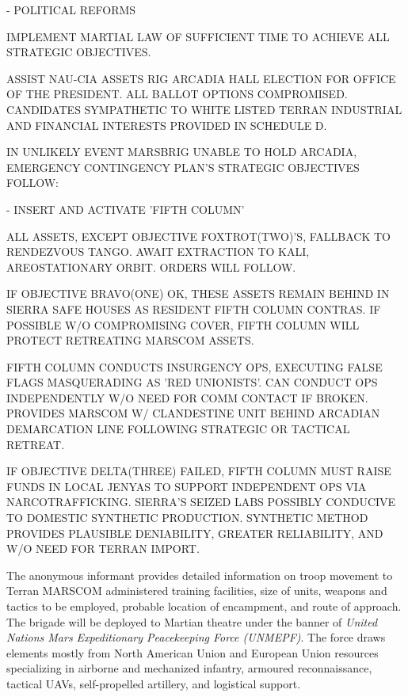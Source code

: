 \item {} - POLITICAL REFORMS
    \startitemize[n]
    \item IMPLEMENT MARTIAL LAW OF SUFFICIENT TIME TO ACHIEVE ALL STRATEGIC OBJECTIVES.
    \item ASSIST NAU-CIA ASSETS RIG ARCADIA HALL ELECTION FOR OFFICE OF THE PRESIDENT. ALL BALLOT OPTIONS COMPROMISED. CANDIDATES SYMPATHETIC TO WHITE LISTED TERRAN INDUSTRIAL AND FINANCIAL INTERESTS PROVIDED IN SCHEDULE D.
    \stopitemize
\stopitemize

IN UNLIKELY EVENT MARSBRIG UNABLE TO HOLD ARCADIA, EMERGENCY CONTINGENCY PLAN'S STRATEGIC OBJECTIVES FOLLOW:
\startitemize[4]
\item {} - INSERT AND ACTIVATE 'FIFTH COLUMN'

    \startitemize[n]
    \item ALL ASSETS, EXCEPT OBJECTIVE FOXTROT(TWO)'S, FALLBACK TO RENDEZVOUS TANGO. AWAIT EXTRACTION TO KALI, AREOSTATIONARY ORBIT. ORDERS WILL FOLLOW.

    \item IF OBJECTIVE BRAVO(ONE) OK, THESE ASSETS REMAIN BEHIND IN SIERRA SAFE HOUSES AS RESIDENT FIFTH COLUMN CONTRAS. IF POSSIBLE W/O COMPROMISING COVER, FIFTH COLUMN WILL PROTECT RETREATING MARSCOM ASSETS.

    \item FIFTH COLUMN CONDUCTS INSURGENCY OPS, EXECUTING FALSE FLAGS MASQUERADING AS 'RED UNIONISTS'. CAN CONDUCT OPS INDEPENDENTLY W/O NEED FOR COMM CONTACT IF BROKEN. PROVIDES MARSCOM W/ CLANDESTINE UNIT BEHIND ARCADIAN DEMARCATION LINE FOLLOWING STRATEGIC OR TACTICAL RETREAT.

    \item IF OBJECTIVE DELTA(THREE) FAILED, FIFTH COLUMN MUST RAISE FUNDS IN LOCAL JENYAS TO SUPPORT INDEPENDENT OPS VIA NARCOTRAFFICKING. SIERRA'S SEIZED LABS POSSIBLY CONDUCIVE TO DOMESTIC SYNTHETIC PRODUCTION. SYNTHETIC METHOD PROVIDES PLAUSIBLE DENIABILITY, GREATER RELIABILITY, AND W/O NEED FOR TERRAN IMPORT.
    \stopitemize
\stopitemize
\stopTimelineCorrespondenceDocument

The anonymous informant provides detailed information on troop movement to Terran MARSCOM administered training facilities, size of units, weapons and tactics to be employed, probable location of encampment, and route of approach. The brigade will be deployed to Martian theatre under the banner of {\it United Nations Mars Expeditionary Peacekeeping Force (UNMEPF)}. The force draws elements mostly from North American Union and European Union resources specializing in airborne and mechanized infantry, armoured reconnaissance, tactical UAVs, self-propelled artillery, and logistical support.

